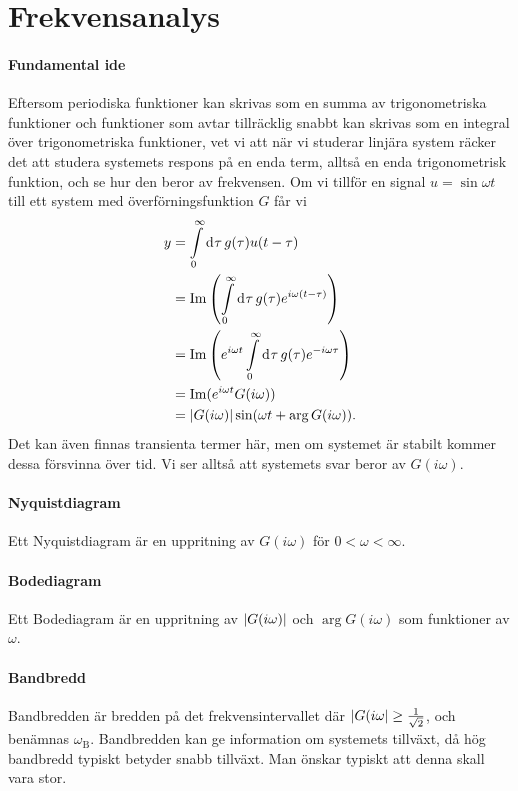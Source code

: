 \section{Frekvensanalys}

\paragraph{Fundamental ide}
Eftersom periodiska funktioner kan skrivas som en summa av trigonometriska funktioner och funktioner som avtar tillräcklig snabbt kan skrivas som en integral över trigonometriska funktioner, vet vi att när vi studerar linjära system räcker det att studera systemets respons på en enda term, alltså en enda trigonometrisk funktion, och se hur den beror av frekvensen. Om vi tillför en signal $u = \sin{\omega t}$ till ett system med överförningsfunktion $G$ får vi
\begin{align*}
	y &= \int\limits_{0}^{\infty}\dd[]{\tau}g(\tau)u(t - \tau) \\
	  &= \Im\left(\int\limits_{0}^{\infty}\dd[]{\tau}g(\tau)e^{i\omega(t - \tau)}\right) \\
	  &= \Im\left(e^{i\omega t}\int\limits_{0}^{\infty}\dd[]{\tau}g(\tau)e^{-i\omega\tau}\right) \\
	  &= \Im(e^{i\omega t}G(i\omega)) \\
	  &= \abs{G(i\omega)}\sin(\omega t + \arg{G(i\omega)}).
\end{align*}
Det kan även finnas transienta termer här, men om systemet är stabilt kommer dessa försvinna över tid. Vi ser alltså att systemets svar beror av $G(i\omega)$.

\paragraph{Nyquistdiagram}
Ett Nyquistdiagram är en uppritning av $G(i\omega)$ för $0 < \omega < \infty$.

\paragraph{Bodediagram}
Ett Bodediagram är en uppritning av $\abs{G(i\omega)}$ och $\arg{G(i\omega)}$ som funktioner av $\omega$.

\paragraph{Bandbredd}
Bandbredden är bredden på det frekvensintervallet där $\abs{G(i\omega} \geq \frac{1}{\sqrt{2}}$, och benämnas $\omega_{\text{B}}$. Bandbredden kan ge information om systemets tillväxt, då hög bandbredd typiskt betyder snabb tillväxt. Man önskar typiskt att denna skall vara stor.

